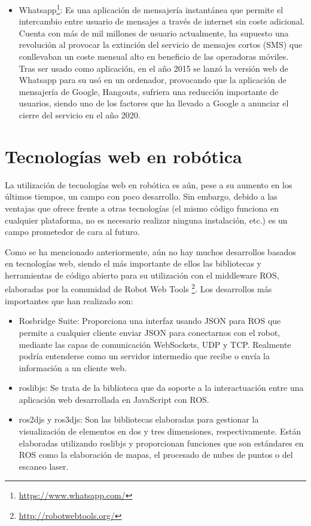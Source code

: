 \begin{itemize}
\item Whatsapp\footnote{\url{https://www.whatsapp.com/}}: Es una aplicación de mensajería instantánea que permite el intercambio entre usuario de mensajes a través de internet sin coste adicional. Cuenta con más de mil millones de usuario actualmente, ha supuesto una revolución al provocar la extinción del servicio de mensajes cortos (SMS) que conllevaban un coste mensual alto en beneficio de las operadoras móviles. Tras ser usado como aplicación, en el año 2015 se lanzó la versión web de Whatsapp para su usó en un ordenador, provocando que la aplicación de mensajería de Google, Hangouts, sufriera una reducción importante de usuarios, siendo uno de los factores que ha llevado a Google a anunciar el cierre del servicio en el año 2020.
\end{itemize}

\section{Tecnologías web en robótica}

La utilización de tecnologías web en robótica es aún, pese a su aumento en los últimos tiempos, un campo con poco desarrollo. Sin embargo, debido a las ventajas que ofrece frente a otras tecnologías (el mismo código funciona en cualquier plataforma, no es necesario realizar ninguna instalación, etc.) es un campo prometedor de cara al futuro.

Como se ha mencionado anteriormente, aún no hay muchos desarrollos basados en tecnologías web, siendo el más importante de ellos las bibliotecas y herramientas de código abierto para su utilización con el middleware ROS, elaboradas por la comunidad de Robot Web Tools \footnote{\url{http://robotwebtools.org/}}.
Los desarrollos más importantes que han realizado son:
\begin{itemize}
	\item Rosbridge Suite: Proporciona una interfaz usando JSON para ROS que permite a cualquier cliente enviar JSON para conectarnos con el robot, mediante las capas de comunicación WebSockets, UDP y TCP. Realmente podría entenderse como un servidor intermedio que recibe o envía la información a un cliente web.
	\item roslibjs: Se trata de la biblioteca que da soporte a la interactuación entre una aplicación web desarrollada en JavaScript con ROS. 
	\item ros2djs y ros3djs: Son las bibliotecas elaboradas para gestionar la visualización de elementos en dos y tres dimensiones, respectivamente. Están elaboradas utilizando roslibjs y proporcionan funciones que son estándares en ROS como la elaboración de mapas, el procesado de nubes de puntos o del escaneo laser.
\end{itemize}

